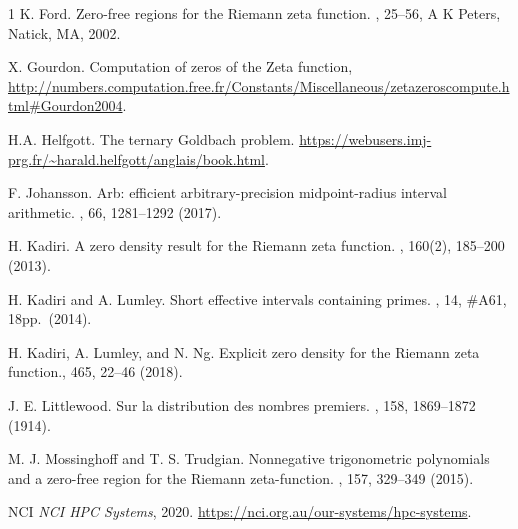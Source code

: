 \documentclass[12pt]{article}
\begin{document}
\begin{thebibliography}{1}
K. Ford.
\newblock Zero-free regions for the Riemann zeta function.
, 25--56, A K Peters, Natick, MA, 2002.

X. Gourdon.
\newblock Computation of zeros of the Zeta function,
\newblock \url{http://numbers.computation.free.fr/Constants/Miscellaneous/zetazeroscompute.html#Gourdon2004}.

H.A. Helfgott.
\newblock The ternary Goldbach problem.
\newblock \url{https://webusers.imj-prg.fr/~harald.helfgott/anglais/book.html}.



F. Johansson.
\newblock Arb: efficient arbitrary-precision midpoint-radius interval arithmetic. 
, 66, 1281--1292 (2017).

H. Kadiri. 
\newblock A zero density result for the Riemann zeta function.
, 160(2), 185--200 (2013).

H. Kadiri and A. Lumley. Short effective intervals containing primes.
, 14, \#A61, 18pp.\ (2014).

H. Kadiri, A. Lumley, and N. Ng. \newblock
Explicit zero density for the Riemann zeta function., 465, 22--46 (2018).

J. E. Littlewood.
\newblock
Sur la distribution des nombres premiers.
, 158, 1869--1872 (1914).

M. J. Mossinghoff and T. S. Trudgian.
\newblock Nonnegative trigonometric polynomials and a zero-free region for the Riemann zeta-function.
, 157, 329--349 (2015).

NCI
\newblock \emph{{NCI HPC Systems}}, 2020.
\newblock \url{https://nci.org.au/our-systems/hpc-systems}.





\end{thebibliography}
\end{document}
